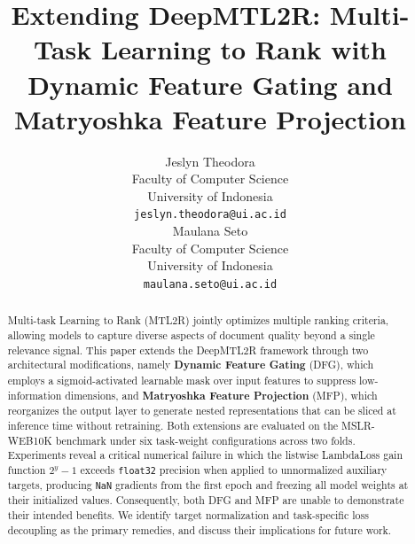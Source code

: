 \documentclass[11pt]{article}
\title{Extending DeepMTL2R: Multi-Task Learning to Rank with Dynamic Feature Gating and Matryoshka Feature Projection}
\author{Jeslyn Theodora \\
  Faculty of Computer Science \\
  University of Indonesia \\
  \texttt{jeslyn.theodora@ui.ac.id} \\\And
  Maulana Seto \\
  Faculty of Computer Science \\
  University of Indonesia \\
  \texttt{maulana.seto@ui.ac.id} \\}
\begin{document}
\begin{abstract}
Multi-task Learning to Rank (MTL2R) jointly optimizes multiple ranking criteria, allowing models to capture diverse aspects of document quality beyond a single relevance signal. This paper extends the DeepMTL2R framework through two architectural modifications, namely \textbf{Dynamic Feature Gating} (DFG), which employs a sigmoid-activated learnable mask over input features to suppress low-information dimensions, and \textbf{Matryoshka Feature Projection} (MFP), which reorganizes the output layer to generate nested representations that can be sliced at inference time without retraining. Both extensions are evaluated on the MSLR-WEB10K benchmark under six task-weight configurations across two folds. Experiments reveal a critical numerical failure in which the listwise LambdaLoss gain function $2^{y}-1$ exceeds \texttt{float32} precision when applied to unnormalized auxiliary targets, producing \texttt{NaN} gradients from the first epoch and freezing all model weights at their initialized values. Consequently, both DFG and MFP are unable to demonstrate their intended benefits. We identify target normalization and task-specific loss decoupling as the primary remedies, and discuss their implications for future work.
\end{abstract}

\maketitle






\end{document}
